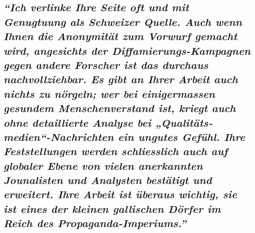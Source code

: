 \hypertarget{ich-verlinke-ihre-seite-oft-und-mit-genugtuung-als-schweizer-quelle-auch-wenn-ihnen-die-anonymituxe4t-zum-vorwurf-gemacht-wird-angesichts-der-diffamierungs-kampagnen-gegen-andere-forscher-ist-das-durchaus-nachvollziehbar-es-gibt-an-ihrer-arbeit-auch-nichts-zu-nuxf6rgeln-wer-bei-einigermassen-gesundem-menschenverstand-ist-kriegt-auch-ohne-detaillierte-analyse-bei-qualituxe4tsmedien-nachrichten-ein-ungutes-gefuxfchl-ihre-feststellungen-werden-schliesslich-auch-auf-globaler-ebene-von-vielen-anerkannten-jounalisten-und-analysten-bestuxe4tigt-und-erweitert-ihre-arbeit-ist-uxfcberaus-wichtig-sie-ist-eines-der-kleinen-gallischen-duxf6rfer-im-reich-des-propaganda-imperiums}{%
\subsection{\texorpdfstring{\emph{``Ich verlinke Ihre Seite oft und mit
Genugtuung als Schweizer Quelle. Auch wenn Ihnen die Anonymität zum
Vorwurf gemacht wird, angesichts der Diffamierungs-Kampagnen gegen
andere Forscher ist das durchaus nachvollziehbar. Es gibt an Ihrer
Arbeit auch nichts zu nörgeln; wer bei einigermassen gesundem
Menschen­verstand ist, kriegt auch ohne detaillierte Analyse bei
„Qualitäts­medien``-Nachrichten ein ungutes Gefühl. Ihre Feststellungen
werden schliesslich auch auf globaler Ebene von vielen anerkannten
Jounalisten und Analysten bestätigt und erweitert. Ihre Arbeit ist
überaus wichtig, sie ist eines der kleinen gallischen Dörfer im Reich
des
Propaganda-Imperiums.''}}{``Ich verlinke Ihre Seite oft und mit Genugtuung als Schweizer Quelle. Auch wenn Ihnen die Anonymität zum Vorwurf gemacht wird, angesichts der Diffamierungs-Kampagnen gegen andere Forscher ist das durchaus nachvollziehbar. Es gibt an Ihrer Arbeit auch nichts zu nörgeln; wer bei einigermassen gesundem Menschen­verstand ist, kriegt auch ohne detaillierte Analyse bei „Qualitäts­medien``-Nachrichten ein ungutes Gefühl. Ihre Feststellungen werden schliesslich auch auf globaler Ebene von vielen anerkannten Jounalisten und Analysten bestätigt und erweitert. Ihre Arbeit ist überaus wichtig, sie ist eines der kleinen gallischen Dörfer im Reich des Propaganda-Imperiums.''}}\label{ich-verlinke-ihre-seite-oft-und-mit-genugtuung-als-schweizer-quelle-auch-wenn-ihnen-die-anonymituxe4t-zum-vorwurf-gemacht-wird-angesichts-der-diffamierungs-kampagnen-gegen-andere-forscher-ist-das-durchaus-nachvollziehbar-es-gibt-an-ihrer-arbeit-auch-nichts-zu-nuxf6rgeln-wer-bei-einigermassen-gesundem-menschenverstand-ist-kriegt-auch-ohne-detaillierte-analyse-bei-qualituxe4tsmedien-nachrichten-ein-ungutes-gefuxfchl-ihre-feststellungen-werden-schliesslich-auch-auf-globaler-ebene-von-vielen-anerkannten-jounalisten-und-analysten-bestuxe4tigt-und-erweitert-ihre-arbeit-ist-uxfcberaus-wichtig-sie-ist-eines-der-kleinen-gallischen-duxf6rfer-im-reich-des-propaganda-imperiums}}

